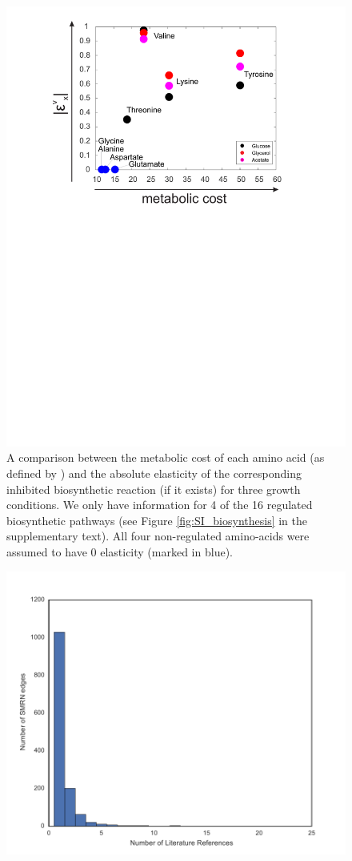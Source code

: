 \documentclass[12pt,a4paper]{article}
\begin{document}
\begin{figure}[ht!]
	\includegraphics[width=\textwidth]{../manuscript/figS9.pdf}
	\caption{A comparison between the metabolic cost of each amino acid (as defined by \cite{Akashi2002-ew}) and the absolute elasticity of the corresponding inhibited biosynthetic reaction (if it exists) for three growth conditions. We only have information for 4 of the 16 regulated biosynthetic pathways (see Figure \ref{fig:SI_biosynthesis} in the supplementary text). All four non-regulated amino-acids were assumed to have 0 elasticity (marked in blue).
	}
\end{figure}

\begin{figure}[ht!]
	\includegraphics[width=\textwidth]{../manuscript/figS11.pdf}
	\caption{}
\end{figure}
\end{document}
